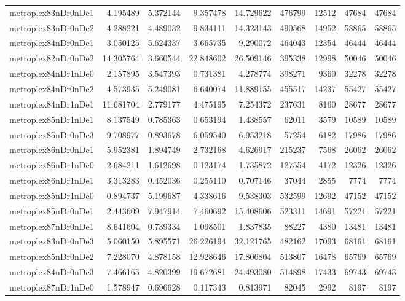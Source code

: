 \begin{longtable}{|l|r|r|r|r|r|r|r|r|}
metroplex83nDr0nDe1 & 4.195489 & 5.372144 & 9.357478 & 14.729622 & 476799 & 12512 & 47684 & 47684 \\
metroplex83nDr0nDe2 & 4.288221 & 4.489032 & 9.834111 & 14.323143 & 490568 & 14952 & 58865 & 58865 \\
metroplex84nDr0nDe1 & 3.050125 & 5.624337 & 3.665735 & 9.290072 & 464043 & 12354 & 46444 & 46444 \\
metroplex82nDr0nDe2 & 14.305764 & 3.660544 & 22.848602 & 26.509146 & 395338 & 12998 & 50046 & 50046 \\
metroplex84nDr1nDe0 & 2.157895 & 3.547393 & 0.731381 & 4.278774 & 398271 & 9360 & 32278 & 32278 \\
metroplex84nDr0nDe2 & 4.573935 & 5.249081 & 6.640074 & 11.889155 & 455517 & 14237 & 55427 & 55427 \\
metroplex84nDr1nDe1 & 11.681704 & 2.779177 & 4.475195 & 7.254372 & 237631 & 8160 & 28677 & 28677 \\
metroplex85nDr1nDe1 & 8.137549 & 0.785363 & 0.653194 & 1.438557 & 62011 & 3579 & 10589 & 10589 \\
metroplex85nDr0nDe3 & 9.708977 & 0.893678 & 6.059540 & 6.953218 & 57254 & 6182 & 17986 & 17986 \\
metroplex86nDr0nDe1 & 5.952381 & 1.894749 & 2.732168 & 4.626917 & 215237 & 7568 & 26062 & 26062 \\
metroplex86nDr1nDe0 & 2.684211 & 1.612698 & 0.123174 & 1.735872 & 127554 & 4172 & 12326 & 12326 \\
metroplex86nDr1nDe1 & 3.313283 & 0.452036 & 0.255110 & 0.707146 & 37044 & 2855 & 7774 & 7774 \\
metroplex85nDr1nDe0 & 0.894737 & 5.199687 & 4.338616 & 9.538303 & 532599 & 12692 & 47152 & 47152 \\
metroplex85nDr0nDe1 & 2.443609 & 7.947914 & 7.460692 & 15.408606 & 523311 & 14691 & 57221 & 57221 \\
metroplex87nDr0nDe1 & 8.641604 & 0.739334 & 1.098501 & 1.837835 & 88227 & 4380 & 13481 & 13481 \\
metroplex83nDr0nDe3 & 5.060150 & 5.895571 & 26.226194 & 32.121765 & 482162 & 17093 & 68161 & 68161 \\
metroplex85nDr0nDe2 & 7.228070 & 4.878158 & 12.928646 & 17.806804 & 513807 & 16478 & 65769 & 65769 \\
metroplex84nDr0nDe3 & 7.466165 & 4.820399 & 19.672681 & 24.493080 & 514898 & 17433 & 69743 & 69743 \\
metroplex87nDr1nDe0 & 1.578947 & 0.696628 & 0.117343 & 0.813971 & 82045 & 2992 & 8197 & 8197 \\

\end{longtable}
